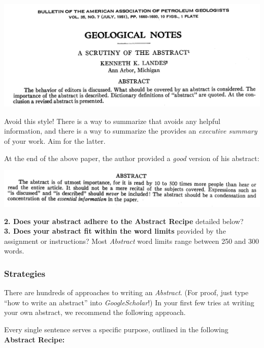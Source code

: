 \documentclass[]{book}
\begin{document}
\includegraphics{img/abstracts-bad.png}

Avoid this style! There is a way to summarize that avoids any helpful information, and there is a way to summarize the provides an \emph{executive summary} of your work. Aim for the latter.

At the end of the above paper, the author provided a \emph{good} version of his abstract:

\includegraphics{img/abstracts-good.png}

\textbf{2. Does your abstract adhere to the Abstract Recipe} detailed below?\\
\textbf{3. Does your abstract fit within the word limits} provided by the assignment or instructions? Most \emph{Abstract} word limits range between 250 and 300 words.

\hypertarget{strategies}{%
\subsubsection*{Strategies}\label{strategies}}

There are hundreds of approaches to writing an \emph{Abstract}. (For proof, just type ``how to write an abstract'' into \emph{GoogleScholar}!) In your first few tries at writing your own abstract, we recommend the following approach.

Every single sentence serves a specific purpose, outlined in the following \textbf{Abstract Recipe:}
\end{document}
